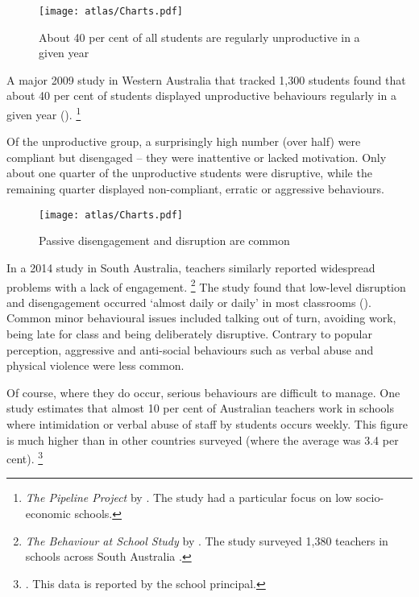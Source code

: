 \documentclass{grattan}
\begin{document}
\begin{figure}
\caption{About 40 per cent of all students are regularly unproductive in a given year\label{fig:40-pc-regularly-unproductive}}%
\texttt{[image: atlas/Charts.pdf]}
%
{\textcite{Angus2009PipelineProject}}
\end{figure}

A major 2009 study in Western Australia that tracked 1,300 students found that about 40 per cent of students displayed unproductive behaviours regularly in a given year  ().%
    \footnote{\emph{The Pipeline Project} by \textcite{Angus2009PipelineProject}. The study had a  particular focus on low socio-economic schools.}

Of the unproductive group, a surprisingly high number (over half) were compliant but disengaged -- they were inattentive or lacked motivation. Only about one quarter of the unproductive students were disruptive, while the remaining quarter displayed non-compliant, erratic or aggressive behaviours.

\begin{figure}
\caption{Passive disengagement and disruption are common\label{fig:disengagement-disruption-common}}%
\texttt{[image: atlas/Charts.pdf]}
\end{figure}

In a 2014 study in South Australia, teachers similarly reported widespread problems with a lack of engagement.%
    \footnote{\emph{The Behaviour at School Study}
    by \textcite{Sullivan2014PunishThemEngage}. The study surveyed 1,380 teachers in schools across South Australia .}
The study found that low-level disruption and disengagement occurred `almost daily or daily' in most classrooms  ().
Common minor behavioural issues included talking out of turn, avoiding work, being late for class and being deliberately disruptive. Contrary to popular perception, aggressive and anti-social behaviours such as verbal abuse and physical violence were less common. %

Of course, where they do occur, serious behaviours are difficult to manage. One study estimates that almost 10 per cent of Australian teachers work in schools where intimidation or verbal abuse of staff by students occurs weekly. This figure is much higher than in other countries surveyed (where the average was 3.4 per cent).%
    \footnote{\textcite{Freeman2014AustralianTeachersLearning}. This data is reported by the school principal.}
\end{document}
